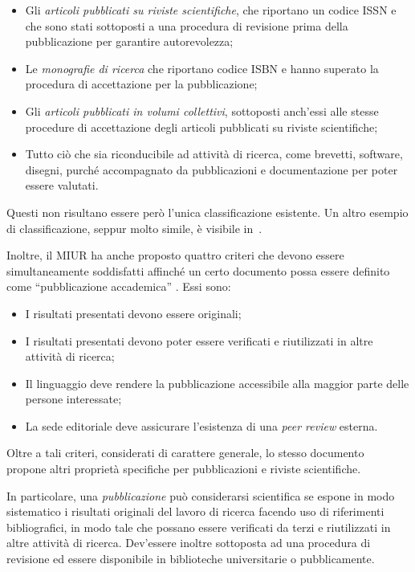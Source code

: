 \begin{itemize}
    \item Gli \textit{articoli pubblicati su riviste scientifiche}, che
    riportano un codice ISSN e che sono stati  sottoposti a una procedura di
    revisione prima della pubblicazione per garantire autorevolezza;
    \item Le \textit{monografie di ricerca} che riportano codice ISBN e hanno
    superato la procedura di  accettazione per la pubblicazione;
    \item Gli \textit{articoli pubblicati in volumi collettivi}, sottoposti
    anch'essi alle stesse procedure di  accettazione degli articoli pubblicati
    su riviste scientifiche;
    \item Tutto ciò che sia riconducibile ad attività di ricerca, come brevetti, software, disegni, 
    purché accompagnato da pubblicazioni e documentazione per poter essere valutati.
\end{itemize}
%
Questi non risultano essere però l'unica classificazione esistente. Un altro
esempio di classificazione, seppur molto simile, è visibile in~\cite{oechsner2013}.

Inoltre, il MIUR ha anche proposto quattro criteri che devono essere
simultaneamente soddisfatti affinché un certo documento possa essere definito
come ``pubblicazione accademica'' \cite{criteri2013pubblicazioni}.
Essi sono:

\begin{itemize}
    \item I risultati presentati devono essere originali;
    \item I risultati presentati devono poter essere verificati e riutilizzati
    in altre attività di ricerca;
    \item Il linguaggio deve rendere la pubblicazione accessibile alla maggior
    parte delle persone interessate;
    \item La sede editoriale deve assicurare l’esistenza di una \textit{peer review} esterna.
\end{itemize}

Oltre a tali criteri, considerati di carattere generale, lo stesso
documento~\cite{criteri2013pubblicazioni} propone altri proprietà specifiche per
pubblicazioni e riviste scientifiche.

In particolare, una \textit{pubblicazione} può considerarsi scientifica se
espone in modo sistematico i risultati originali del lavoro di ricerca facendo
uso di riferimenti bibliografici, in modo tale che possano essere verificati da
terzi e riutilizzati in altre attività di ricerca.
Dev'essere inoltre sottoposta ad una procedura di revisione ed essere disponibile
in biblioteche universitarie o pubblicamente.

